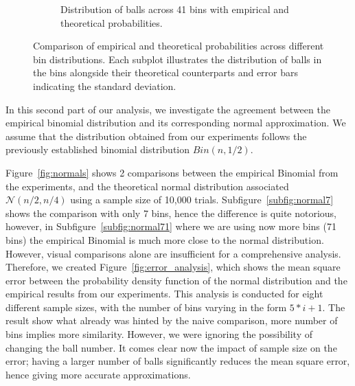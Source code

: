 \documentclass[a4paper, 11pt]{article}
\begin{document}
\begin{figure}[H]
\begin{subfigure}[t]{0.45\textwidth}
        \caption{Distribution of balls across 41 bins with empirical and theoretical probabilities.}
        \label{subfig:41bins}
    \end{subfigure}
    
    \caption{Comparison of empirical and theoretical probabilities across different bin distributions. Each subplot illustrates the distribution of balls in the bins alongside their theoretical counterparts and error bars indicating the standard deviation.}
    \label{fig:comparison}
\end{figure}

In this second part of our analysis, we investigate the agreement between the empirical binomial distribution and its corresponding normal approximation. We assume that the distribution obtained from our experiments follows the previously established binomial distribution  $Bin(n,1/2)$.

Figure~\ref{fig:normals} shows 2 comparisons between the empirical Binomial from the experiments, and the theoretical normal distribution associated $\mathcal{N}(n/2,n/4)$ using a sample size of 10,000 trials. Subfigure~\ref{subfig:normal7} shows the comparison with only 7 bins, hence the difference is quite notorious, however, in Subfigure~\ref{subfig:normal71} where we are using now more bins (71 bins) the empirical Binomial is much more close to the normal distribution. However, visual comparisons alone are insufficient for a comprehensive analysis. 
Therefore, we created Figure~\ref{fig:error_analysis}, which shows the mean square error between the probability density function of the normal distribution and the empirical results from our experiments. This analysis is conducted for eight different sample sizes, with the number of bins varying in the form $5*i +1$. The result show what already was hinted by the naive comparison, more number of bins implies more similarity. However, we were ignoring the possibility of changing the ball number. It comes clear now the impact of sample size on the error; having a larger number of balls significantly reduces the mean square error, hence giving more accurate approximations.
\end{document}
